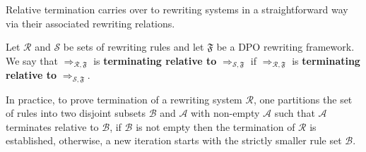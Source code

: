 Relative termination 
carries over to rewriting systems in a straightforward way via their associated rewriting relations.
\begin{definition}
    \label{termination:def:relative_termination}
     Let $\mathcal{R}$ and $\mathcal{S}$ be sets of rewriting rules and let $\mathfrak{F}$ be a DPO rewriting framework. 
     We say that $\mathop{\Rightarrow}_{\mathcal{R},\mathfrak{F}}$ is \textbf{terminating relative to} $\mathop{\Rightarrow}_{\mathcal{S}, \mathfrak{F}}$ if 
     $\mathop{\Rightarrow}_{\mathcal{R},\mathfrak{F}}$ is \textbf{terminating relative to} $\mathop{\Rightarrow}_{\mathcal{S}, \mathfrak{F}}$.
\end{definition}
In practice, to prove termination of a rewriting system $\mathcal{R}$, one partitions the set of rules into two disjoint subsets \( \mathcal{B} \) and \( \mathcal{A} \) with non-empty $\mathcal{A}$ such that \( \mathcal{A} \) terminates relative to \( \mathcal{B} \), if $\mathcal{B}$ is not empty then the termination of $\mathcal{R}$ is established, otherwise, a new iteration starts with the strictly smaller rule set $\mathcal{B}$.
 